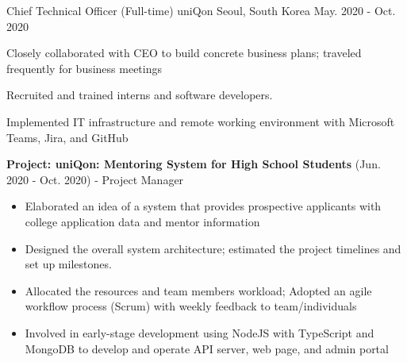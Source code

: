 \begin{cventries}
  \cventry
  {Chief Technical Officer (Full-time)} %
  {uniQon} %
  {Seoul, South Korea} %
  {May. 2020 - Oct. 2020} %
  {
    \begin{cvitems} %
      \item {Closely collaborated with CEO to build concrete business plans; traveled frequently for business meetings}
      \item {Recruited and trained interns and software developers.}
      \item {Implemented IT infrastructure and remote working environment with Microsoft Teams, Jira, and GitHub}
      \item {\textbf{Project: uniQon: Mentoring System for High School Students} (Jun. 2020 - Oct. 2020) - Project Manager}
      \begin{itemize}[leftmargin=0pt, label={}]
        \item {Elaborated an idea of a system that provides prospective applicants with college application data and mentor information}
        \item {Designed the overall system architecture; estimated the project timelines and set up milestones.}
        \item {Allocated the resources and team members workload; Adopted an agile workflow process (Scrum) with weekly feedback to team/individuals}
        \item {Involved in early-stage development using NodeJS with TypeScript and MongoDB to develop and operate API server, web page, and admin portal}
      \end{itemize}
    \end{cvitems}
  }


\end{cventries}
